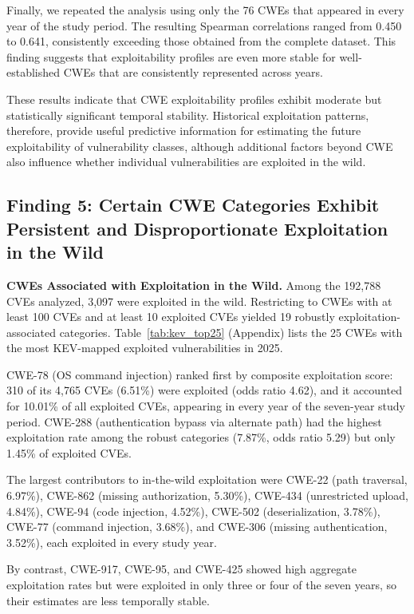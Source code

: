 \documentclass[conference,compsoc]{IEEEtran}
\begin{document}
Finally, we repeated the analysis using only the 76 CWEs that appeared in every year of the study period. The resulting Spearman correlations ranged from 0.450 to 0.641, consistently exceeding those obtained from the complete dataset. This finding suggests that exploitability profiles are even more stable for well-established CWEs that are consistently represented across years.

These results indicate that CWE exploitability profiles exhibit moderate but statistically significant temporal stability. Historical exploitation patterns, therefore, provide useful predictive information for estimating the future exploitability of vulnerability classes, although additional factors beyond CWE also influence whether individual vulnerabilities are exploited in the wild.

\subsection{Finding 5: Certain CWE Categories Exhibit Persistent
and Disproportionate Exploitation in the Wild}

\textbf{CWEs Associated with Exploitation in the Wild.}
Among the 192,788 CVEs analyzed, 3,097 were exploited in
the wild. Restricting to CWEs with at least 100 CVEs and at
least 10 exploited CVEs yielded 19 robustly
exploitation-associated categories. Table~\ref{tab:kev_top25}
(Appendix) lists the 25 CWEs with the most KEV-mapped
exploited vulnerabilities in 2025.

CWE-78 (OS command injection) ranked first by composite
exploitation score: 310 of its 4,765 CVEs (6.51\%) were
exploited (odds ratio 4.62), and it accounted for 10.01\%
of all exploited CVEs, appearing in every year of the
seven-year study period. CWE-288 (authentication bypass via
alternate path) had the highest exploitation rate among the
robust categories (7.87\%, odds ratio 5.29) but only 1.45\%
of exploited CVEs.

The largest contributors to in-the-wild exploitation
were CWE-22 (path traversal, 6.97\%), CWE-862 (missing
authorization, 5.30\%), CWE-434 (unrestricted upload,
4.84\%), CWE-94 (code injection, 4.52\%), CWE-502
(deserialization, 3.78\%), CWE-77 (command injection,
3.68\%), and CWE-306 (missing authentication, 3.52\%), each
exploited in every study year.

By contrast, CWE-917, CWE-95, and CWE-425 showed high
aggregate exploitation rates but were exploited in only
three or four of the seven years, so their estimates are
less temporally stable.
\end{document}
